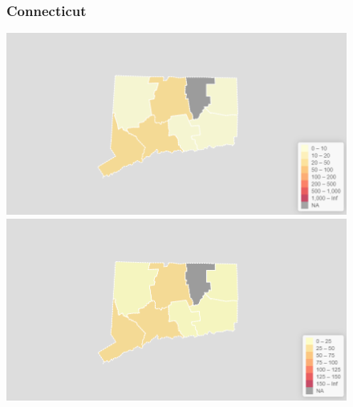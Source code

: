 \documentclass[11pt]{article}
\begin{document}
\begin{landscape}
\begin{figure}[h]
\subsubsection*{Connecticut}
\vfill
\hspace*{-3cm}
\begin{minipage}{.8\textwidth}
    \includegraphics[width=.95\textwidth]{ImageResults/ConnecticutTotal.PNG}
\end{minipage}%
\begin{minipage}{.8\textwidth}
    \includegraphics[width=.95\textwidth]{ImageResults/Connecticut100k.PNG}
\end{minipage}
\fillandplacepagenumber
\end{figure}
\end{landscape}
\end{document}
